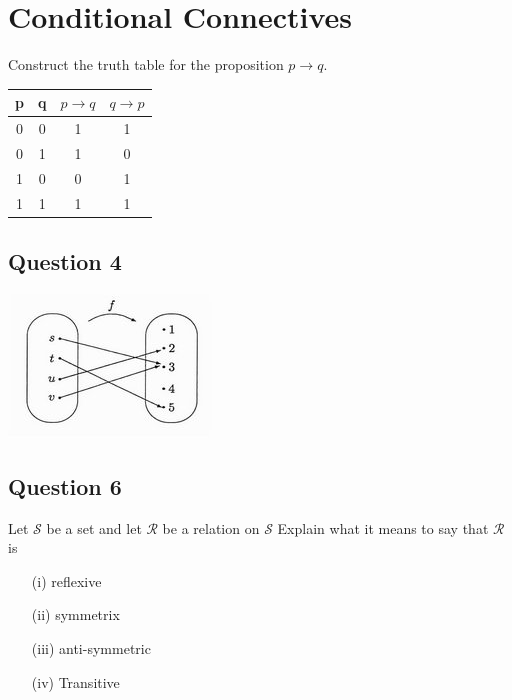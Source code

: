 \documentclass[]{report}
\begin{document}
\section{Conditional Connectives}
Construct the truth table for the proposition $p \rightarrow q$.

\begin{center}
\begin{tabular}{|c|c|c|c|}
\hline
p & q & $p \rightarrow q$ & $q \rightarrow p$ \\
\hline
0 & 0 & 1& 1 \\
0 & 1 & 1 & 0 \\
1 & 0 & 0 & 1 \\
1 & 1 & 1 & 1 \\
\hline
\end{tabular}
\end{center}


\subsection*{Question 4}
\begin{center}
\includegraphics[scale=0.55]{HibCollArrow.jpg}
\end{center}

\subsection*{Question 6}
Let $\mathcal{S}$ be a set and let $\mathcal{R}$ be a relation on $\mathcal{S}$
Explain what it means to say that $\mathcal{R}$ is

\begin{itemize}
\item[(i)] reflexive
\item[(ii)] symmetrix
\item[(iii)] anti-symmetric
\item[(iv)] Transitive
\end{itemize}
\end{document}

